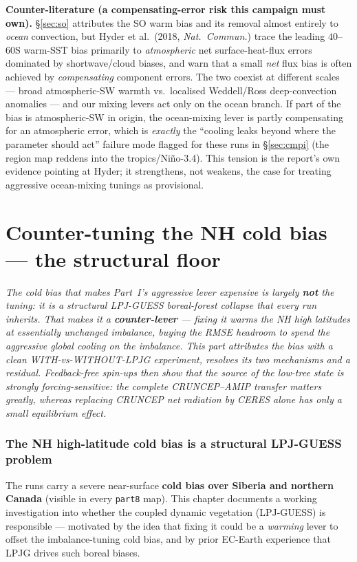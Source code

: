\documentclass[10pt]{article}
\begin{document}
\textbf{Counter-literature (a compensating-error risk this campaign must own).} \S\ref{sec:so} attributes the SO warm
bias and its removal almost entirely to \emph{ocean} convection, but Hyder et al.\ (2018, \emph{Nat.\ Commun.})
trace the leading $40$--$60$\textdegree S warm-SST bias primarily to \emph{atmospheric} net surface-heat-flux errors
dominated by shortwave/cloud biases, and warn that a small \emph{net} flux bias is often achieved by
\emph{compensating} component errors. The two coexist at different scales --- broad atmospheric-SW warmth vs.\
localised Weddell/Ross deep-convection anomalies --- and our mixing levers act only on the ocean branch. If part of
the bias is atmospheric-SW in origin, the ocean-mixing lever is partly compensating for an atmospheric error, which
is \emph{exactly} the ``cooling leaks beyond where the parameter should act'' failure mode flagged for these runs in
\S\ref{sec:cmpi} (the region map reddens into the tropics/Ni\~no-3.4). This tension is the report's own evidence
pointing at Hyder; it strengthens, not weakens, the case for treating aggressive ocean-mixing tunings as
provisional.

\clearpage
\part{Counter-tuning the NH cold bias --- the structural floor}
\emph{The cold bias that makes Part~I's aggressive lever expensive is largely \textbf{not} the tuning: it is a
structural LPJ-GUESS boreal-forest collapse that every run inherits. That makes it a \textbf{counter-lever} --- fixing
it warms the NH high latitudes at essentially unchanged imbalance, buying the RMSE headroom to spend the aggressive
global cooling on the imbalance. This part attributes the bias with a clean WITH-vs-WITHOUT-LPJG experiment, resolves
its two mechanisms and a residual. Feedback-free spin-ups then show that the \emph{source} of the low-tree state
is strongly forcing-sensitive: the complete CRUNCEP--AMIP transfer matters greatly, whereas replacing CRUNCEP net
radiation by CERES alone has only a small equilibrium effect.}

\section{The NH high-latitude cold bias is a structural LPJ-GUESS problem}\label{sec:lpjg}
The runs carry a severe near-surface \textbf{cold bias over Siberia and northern Canada} (visible in every
\texttt{part8} map). This chapter documents a working investigation into whether the coupled dynamic vegetation
(LPJ-GUESS) is responsible --- motivated by the idea that fixing it could be a \emph{warming} lever to offset the
imbalance-tuning cold bias, and by prior EC-Earth experience that LPJG drives such boreal biases.
\end{document}
